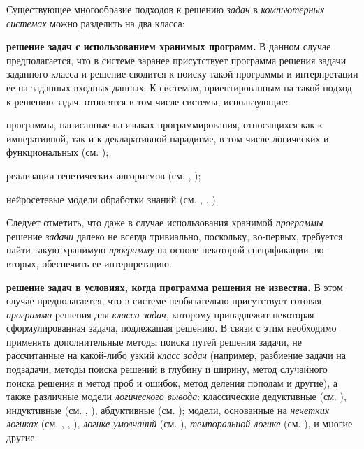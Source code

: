 Существующее многообразие подходов к решению \textit{задач} в \textit{компьютерных системах} можно разделить на два класса:
\begin{textitemize}
	\item \textbf{решение задач с использованием хранимых программ.} В данном случае предполагается, что в системе заранее присутствует программа решения задачи заданного класса и решение сводится к поиску такой программы и интерпретации ее на заданных входных данных. К системам, ориентированным на такой подход к решению задач, относятся в том числе системы, использующие:
	\begin{textitemize}
		\item программы, написанные на языках программирования, относящихся как к императивной, так и к декларативной парадигме, в том числе логических и функциональных (см. );
		\item реализации генетических алгоритмов (см. , );
		\item нейросетевые модели обработки знаний (см. , , ).
	\end{textitemize}	
	\vspace{-2\parskip}
	Следует отметить, что даже в случае использования хранимой \textit{программы} решение \textit{задачи} далеко не всегда тривиально, поскольку, во-первых, требуется найти такую хранимую \textit{программу} на основе некоторой спецификации, во-вторых, обеспечить ее интерпретацию.
	\vspace{\parskip}
	\item \textbf{решение задач в условиях, когда программа решения не известна.} В этом случае предполагается, что в системе необязательно присутствует готовая \textit{программа} решения для \textit{класса задач}, которому принадлежит некоторая сформулированная задача, подлежащая решению. В связи с этим необходимо применять дополнительные методы поиска путей решения задачи, не рассчитанные на какой-либо узкий \textit{класс задач} (например, разбиение задачи на подзадачи, методы поиска решений в глубину и ширину, метод случайного поиска решения и метод проб и ошибок, метод деления пополам и другие), а также различные модели \textit{логического вывода}: классические дедуктивные (см. ), индуктивные (см. , ), абдуктивные (см. ); модели, основанные на \textit{нечетких логиках} (см. , , ), \textit{логике умолчаний} (см. ), \textit{темпоральной логике} (см. ), и многие другие.
\end{textitemize}

